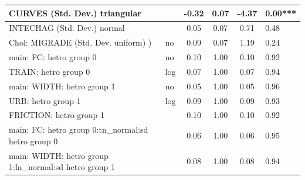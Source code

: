 \begin{table}
\begin{center}
\begin{tabular}{|l|l|c|c|c|l|}
			\hline
			CURVES (Std. Dev.) triangular &  & -0.32 & 0.07 & -4.37 & 0.00*** \\
			\hline
			INTECHAG (Std. Dev.) normal &  & 0.05 & 0.07 & 0.71 & 0.48 \\
			\hline
			 Chol: MIGRADE (Std. Dev. uniform) ) & no & 0.09 & 0.07 & 1.19 & 0.24 \\
			\hline
			main: FC: hetro group 0 & no & 0.10 & 1.00 & 0.10 & 0.92 \\
			\hline
			TRAIN: hetro group 0 & log & 0.07 & 1.00 & 0.07 & 0.94 \\
			\hline
			main: WIDTH: hetro group 1 & no & 0.05 & 1.00 & 0.05 & 0.96 \\
			\hline
			URB: hetro group 1 & log & 0.09 & 1.00 & 0.09 & 0.93 \\
			\hline
			FRICTION: hetro group 1 &  & 0.10 & 1.00 & 0.10 & 0.92 \\
			\hline
			main: FC: hetro group 0:tn_normal:sd  hetro group 0 &  & 0.06 & 1.00 & 0.06 & 0.95 \\
			\hline
			main: WIDTH: hetro group 1:ln_normal:sd  hetro group 1 &  & 0.08 & 1.00 & 0.08 & 0.94 \\
			\hline
		\end{tabular}
	\end{center}
\end{table}